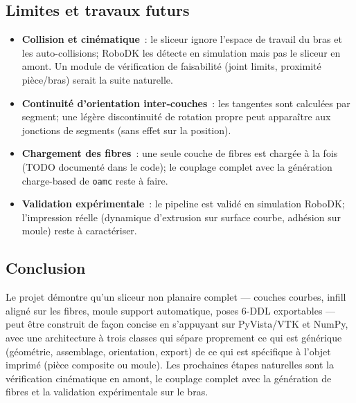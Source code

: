 \documentclass[11pt,a4paper]{article}
\begin{document}
\subsection{Limites et travaux futurs}
\begin{itemize}
  \item \textbf{Collision et cinématique}~: le sliceur ignore l'espace
        de travail du bras et les auto-collisions; RoboDK les détecte
        en simulation mais pas le sliceur en amont. Un module de
        vérification de faisabilité (joint limits, proximité
        pièce/bras) serait la suite naturelle.
  \item \textbf{Continuité d'orientation inter-couches}~: les tangentes
        sont calculées par segment; une légère discontinuité de
        rotation propre peut apparaître aux jonctions de segments
        (sans effet sur la position).
  \item \textbf{Chargement des fibres}~: une seule couche de fibres est
        chargée à la fois (TODO documenté dans le code); le
        couplage complet avec la génération charge-based de
        \texttt{oamc} reste à faire.
  \item \textbf{Validation expérimentale}~: le pipeline est validé en
        simulation RoboDK; l'impression réelle (dynamique d'extrusion
        sur surface courbe, adhésion sur moule) reste à caractériser.
\end{itemize}

\subsection{Conclusion}
Le projet démontre qu'un sliceur non planaire complet --- couches
courbes, infill aligné sur les fibres, moule support automatique,
poses 6-DDL exportables --- peut être construit de façon concise en
s'appuyant sur PyVista/VTK et NumPy, avec une architecture à trois
classes qui sépare proprement ce qui est générique (géométrie,
assemblage, orientation, export) de ce qui est spécifique à l'objet
imprimé (pièce composite ou moule). Les prochaines étapes naturelles
sont la vérification cinématique en amont, le couplage complet avec la
génération de fibres et la validation expérimentale sur le bras.
\end{document}
